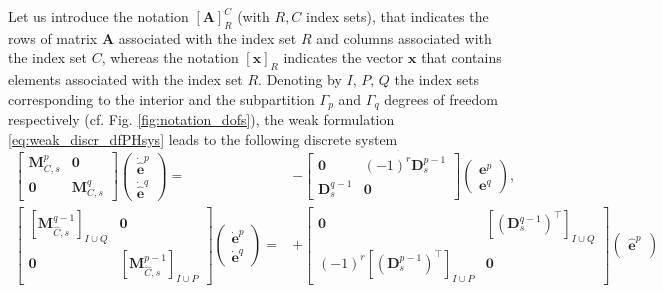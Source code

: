 \documentclass{elsarticle}
\newcommand*{\dual}[1]{\ensuremath{\widehat{#1}}}
\begin{document}
Let us introduce the notation $[\mathbf{A}]_{R}^C$ (with $R, C$ index sets), that indicates the rows of matrix $\mathbf{A}$ associated with the index set $R$ and columns associated with the index set $C$, whereas the notation $[\mathbf{x}]_{R}$ indicates the vector $\mathbf{x}$ that contains elements associated with the index set $R$. Denoting by $I,\, P,\, Q$ the index sets corresponding to the interior and the subpartition ${\Gamma}_p$ and ${\Gamma}_q$ degrees of freedom respectively (cf. Fig. \ref{fig:notation_dofs}), the weak formulation \eqref{eq:weak_discr_dfPHsys} leads to the following discrete system
\begin{equation}\label{eq:discr_dfPHsys}
\begin{aligned}
    \begin{bmatrix}
        \mathbf{M}^p_{C, s} & \mathbf{0} \\
        \mathbf{0} & \mathbf{M}^q_{C, s}
    \end{bmatrix}
    \begin{pmatrix}
    \dot{\dual{\mathbf{e}}}^p \\
    \dot{\dual{\mathbf{e}}}^q
    \end{pmatrix} =&-
    \begin{bmatrix}
        \mathbf{0} & (-1)^r\mathbf{D}^{p-1}_s \\
        \mathbf{D}^{q-1}_s & \mathbf{0}
    \end{bmatrix}
    \begin{pmatrix}
    \mathbf{e}^p \\
    \mathbf{e}^q
    \end{pmatrix}, \\
    \begin{bmatrix}
        [\mathbf{M}^{q-1}_{\dual{C}, s}]_{{I}\cup Q} & \mathbf{0} \\
        \mathbf{0} & [\mathbf{M}^{p-1}_{\dual{C}, s}]_{{I}\cup P}
    \end{bmatrix}
    \begin{pmatrix}
    \dot{\mathbf{e}}^p \\
    \dot{\mathbf{e}}^q
    \end{pmatrix} = 
    &+\begin{bmatrix}
        \mathbf{0} & [(\mathbf{D}_{s}^{q-1})^\top]_{I\cup Q}\\
        (-1)^{r}[(\mathbf{D}_{s}^{p-1})^\top]_{I\cup P} & \mathbf{0}
    \end{bmatrix}
    \begin{pmatrix}
    \dual{\mathbf{e}}^p \\

\end{pmatrix}
\end{aligned}
\end{equation}
\end{document}
